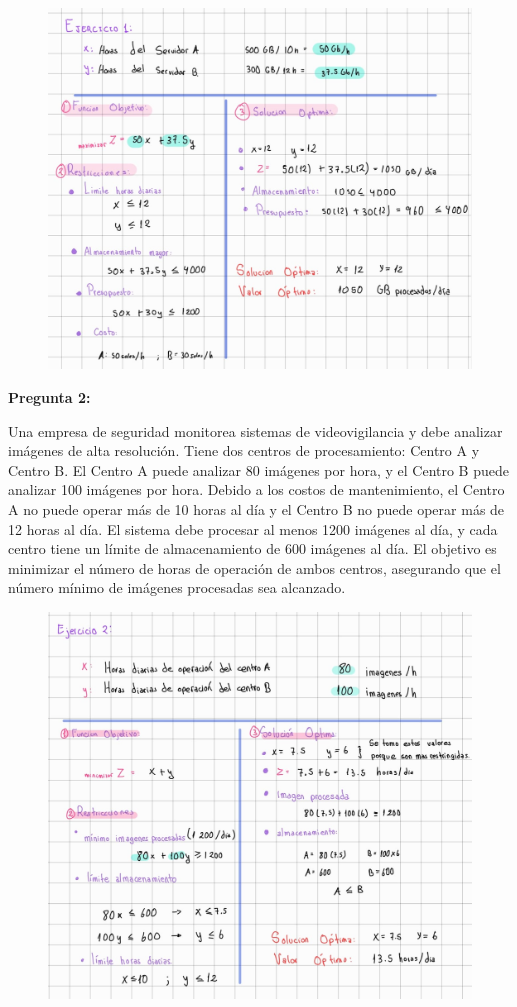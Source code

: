 \documentclass{article}
\begin{document}
\begin{figure}[h]
    \centering
    \includegraphics[width=1\textwidth]{ejercicio1.jpg}
    
    \label{fig:etiqueta}
\end{figure}



\vspace{0.5cm}


\textbf{Pregunta 2:}

Una empresa de seguridad monitorea sistemas de videovigilancia y debe analizar imágenes de alta resolución. Tiene dos centros de procesamiento: Centro A y Centro B. El Centro A puede analizar 80 imágenes por hora, y el Centro B puede analizar 100 imágenes por hora. Debido a los costos de mantenimiento, el Centro A no puede operar más de 10 horas al día y el Centro B no puede operar más de 12 horas al día. El sistema debe procesar al menos 1200 imágenes al día, y cada centro tiene un límite de almacenamiento de 600 imágenes al día. El objetivo es minimizar el número de horas de operación de ambos centros, asegurando que el número mínimo de imágenes procesadas sea alcanzado.

\begin{figure}[h]
    \centering
    \includegraphics[width=1\textwidth]{ejercicio2.jpg}
    
    \label{fig:etiqueta}
\end{figure}
\end{document}
